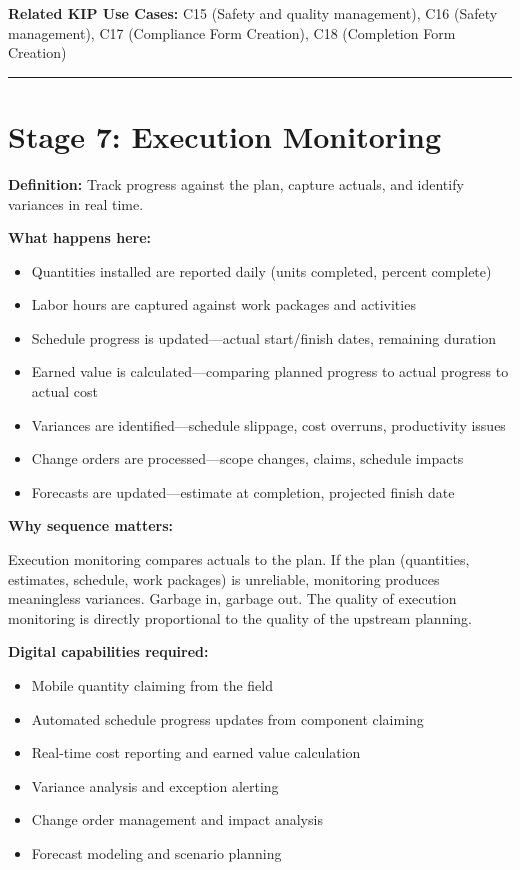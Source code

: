 \documentclass[11pt, letterpaper]{article}
\begin{document}
\textbf{Related KIP Use Cases:} C15 (Safety and quality management), C16 (Safety management), C17 (Compliance Form Creation), C18 (Completion Form Creation)

\vspace{1em}

\hrule

\vspace{1em}

\section*{Stage 7: Execution Monitoring}

\textbf{Definition:} Track progress against the plan, capture actuals, and identify variances in real time.

\textbf{What happens here:}
\begin{itemize}
    \item Quantities installed are reported daily (units completed, percent complete)
    \item Labor hours are captured against work packages and activities
    \item Schedule progress is updated---actual start/finish dates, remaining duration
    \item Earned value is calculated---comparing planned progress to actual progress to actual cost
    \item Variances are identified---schedule slippage, cost overruns, productivity issues
    \item Change orders are processed---scope changes, claims, schedule impacts
    \item Forecasts are updated---estimate at completion, projected finish date
\end{itemize}

\textbf{Why sequence matters:}

Execution monitoring compares actuals to the plan. If the plan (quantities, estimates, schedule, work packages) is unreliable, monitoring produces meaningless variances. Garbage in, garbage out. The quality of execution monitoring is directly proportional to the quality of the upstream planning.

\textbf{Digital capabilities required:}
\begin{itemize}
    \item Mobile quantity claiming from the field
    \item Automated schedule progress updates from component claiming
    \item Real-time cost reporting and earned value calculation
    \item Variance analysis and exception alerting
    \item Change order management and impact analysis
    \item Forecast modeling and scenario planning
\end{itemize}
\end{document}
